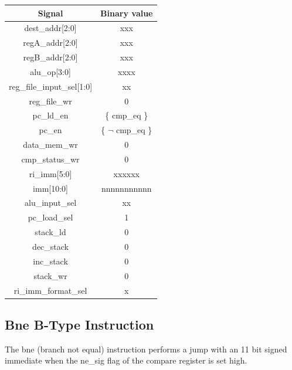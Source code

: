 \documentclass{article}
\begin{document}
\begin{par}
	\begin{center}
		\begin{tabular}{|c|c|}
			\hline 
			\textbf{Signal} & \textbf{Binary value} \\ 
			\hline 
			dest\_addr[2:0] & xxx \\ 
			\hline 
			regA\_addr[2:0] & xxx \\ 
			\hline 
			regB\_addr[2:0] & xxx \\ 
			\hline 
			alu\_op[3:0] & xxxx \\ 
			\hline 
			reg\_file\_input\_sel[1:0] & xx \\ 
			\hline 
			reg\_file\_wr & 0 \\ 
			\hline 
			pc\_ld\_en & \{ cmp\_eq \} \\ 
			\hline 
			pc\_en & \{ $ \lnot $ cmp\_eq \} \\ 
			\hline 
			data\_mem\_wr & 0 \\ 
			\hline 
			cmp\_status\_wr & 0 \\ 
			\hline 
			ri\_imm[5:0] & xxxxxx \\ 
			\hline 
			imm[10:0] & nnnnnnnnnnn \\ 
			\hline 
			alu\_input\_sel & xx \\ 
			\hline 
			pc\_load\_sel & 1 \\ 
			\hline 
			stack\_ld & 0 \\ 
			\hline 
			dec\_stack & 0 \\ 
			\hline 
			inc\_stack & 0 \\ 
			\hline 
			stack\_wr & 0 \\ 
			\hline 
			ri\_imm\_format\_sel & x \\ 
			\hline 
		\end{tabular} 
	\end{center}

	\newpage
	\subsection{Bne B-Type Instruction}
	
	The bne (branch not equal) instruction performs a jump with an 11 bit signed immediate when the ne\_sig flag of the compare register is set high. 
	

\end{par}
\end{document}
